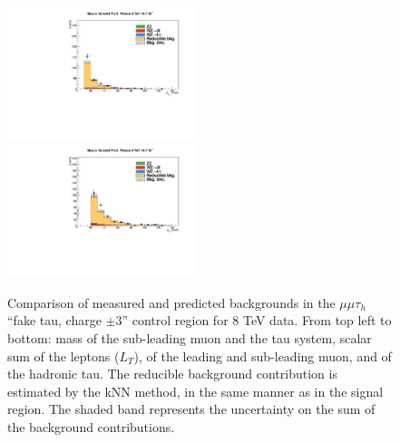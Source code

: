 \begin{figure}
\begin{center}
  \includegraphics[width=0.49\textwidth]{4_Analisys/pics/8TeV/plots/mmt/f3/Full_charge3/final-f3-m2Pt-Full.pdf}\\
  \includegraphics[width=0.49\textwidth]{4_Analisys/pics/8TeV/plots/mmt/f3/Full_charge3/final-f3-tPt-Full.pdf}
  \caption{Comparison of measured and predicted backgrounds in the $\mu\mu\tau_h$ ``fake tau, charge $\pm3$'' control region for 8 TeV data.
  From top left to bottom: mass of the sub-leading muon and the tau system, scalar sum of the leptons \pT ($L_T$), \pT of the leading and sub-leading muon, and \pT of the hadronic tau.
  The reducible background contribution is estimated by the kNN method, in the same manner as in the signal region.
  The shaded band represents the uncertainty on the sum of the background contributions.
  }
  \label{fig:LLT_mmt_f3_charge3_control_8TeV}
\end{center}
\end{figure}

